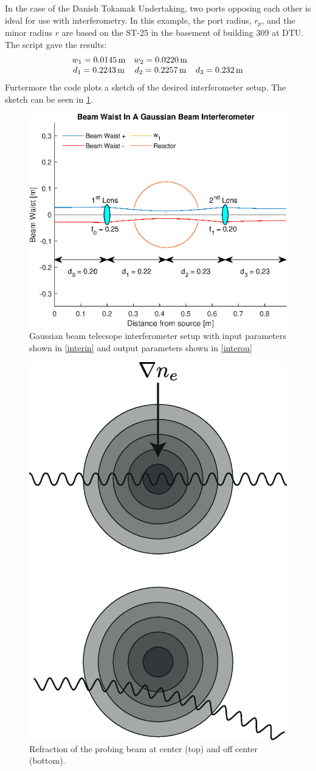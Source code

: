 In the case of the Danish Tokamak Undertaking, two ports opposing each other is ideal for use with interferometry. In this example, the port radius, \(r_p\), and the minor radius \(r\) are based on the ST-25 in the basement of building 309 at DTU.
The script gave the results:
\begin{align}
	\mqty{w_1 = \SI{0.0145}{\meter} & w_2 = \SI{0.0220}{\meter}                                            \\
	d_1 = \SI{0.2243}{\meter}       & d_2 = \SI{0.2257}{\meter} & d_3 = \SI{0.232}{\meter}}\label{interou}
\end{align}
Furtermore the code plots a sketch of the desired interferometer setup. The sketch can be seen in \cref{AWESOME}.\newline
\begin{figure}
	\centering
	\includegraphics[width=.7\textwidth]{MatlabFigures/Interferometer/Interferometer.eps}
	\caption{Gaussian beam telecsope interferometer setup with input parameters shown in \cref{interin} and output parameters shown in \cref{interou}}
	\label{AWESOME}
\end{figure}
\begin{figure}
	\centering
	\includegraphics[width=.3\textwidth]{Figures/Refraction.eps}
	\caption{Refraction of the probing beam at center  (top) and off center (bottom).}
	\label{Refrac}
\end{figure}
